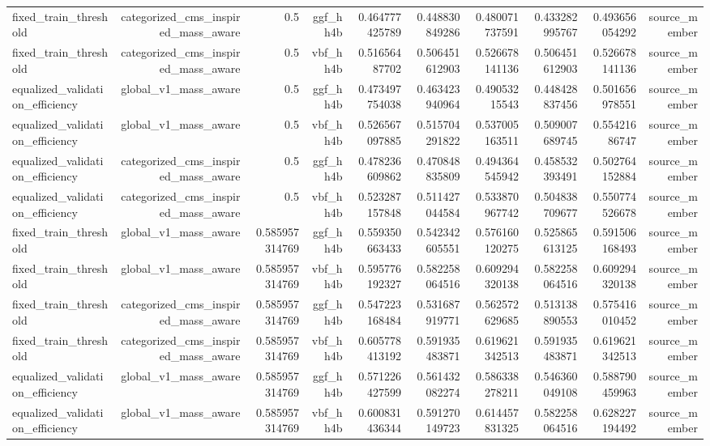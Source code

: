 \begin{table}[htbp]
{\begin{tabular}{lrrrrrrrrr}
fixed\_train\_threshold & categorized\_cms\_inspired\_mass\_aware & 0.5 & ggf\_hh4b & 0.464777425789 & 0.448830849286 & 0.480071737591 & 0.433282995767 & 0.493656054292 & source\_member \\
fixed\_train\_threshold & categorized\_cms\_inspired\_mass\_aware & 0.5 & vbf\_hh4b & 0.51656487702 & 0.506451612903 & 0.526678141136 & 0.506451612903 & 0.526678141136 & source\_member \\
equalized\_validation\_efficiency & global\_v1\_mass\_aware & 0.5 & ggf\_hh4b & 0.473497754038 & 0.463423940964 & 0.49053215543 & 0.448428837456 & 0.501656978551 & source\_member \\
equalized\_validation\_efficiency & global\_v1\_mass\_aware & 0.5 & vbf\_hh4b & 0.526567097885 & 0.515704291822 & 0.537005163511 & 0.509007689745 & 0.55421686747 & source\_member \\
equalized\_validation\_efficiency & categorized\_cms\_inspired\_mass\_aware & 0.5 & ggf\_hh4b & 0.478236609862 & 0.470848835809 & 0.494364545942 & 0.458532393491 & 0.502764152884 & source\_member \\
equalized\_validation\_efficiency & categorized\_cms\_inspired\_mass\_aware & 0.5 & vbf\_hh4b & 0.523287157848 & 0.511427044584 & 0.533870967742 & 0.504838709677 & 0.550774526678 & source\_member \\
fixed\_train\_threshold & global\_v1\_mass\_aware & 0.585957314769 & ggf\_hh4b & 0.559350663433 & 0.542342605551 & 0.576160120275 & 0.525865613125 & 0.591506168493 & source\_member \\
fixed\_train\_threshold & global\_v1\_mass\_aware & 0.585957314769 & vbf\_hh4b & 0.595776192327 & 0.582258064516 & 0.609294320138 & 0.582258064516 & 0.609294320138 & source\_member \\
fixed\_train\_threshold & categorized\_cms\_inspired\_mass\_aware & 0.585957314769 & ggf\_hh4b & 0.547223168484 & 0.531687919771 & 0.562572629685 & 0.513138890553 & 0.575416010452 & source\_member \\
fixed\_train\_threshold & categorized\_cms\_inspired\_mass\_aware & 0.585957314769 & vbf\_hh4b & 0.605778413192 & 0.591935483871 & 0.619621342513 & 0.591935483871 & 0.619621342513 & source\_member \\
equalized\_validation\_efficiency & global\_v1\_mass\_aware & 0.585957314769 & ggf\_hh4b & 0.571226427599 & 0.561432082274 & 0.586338278211 & 0.546360049108 & 0.588790459963 & source\_member \\
equalized\_validation\_efficiency & global\_v1\_mass\_aware & 0.585957314769 & vbf\_hh4b & 0.600831436344 & 0.591270149723 & 0.614457831325 & 0.582258064516 & 0.628227194492 & source\_member \\

\end{tabular}}
\end{table}
